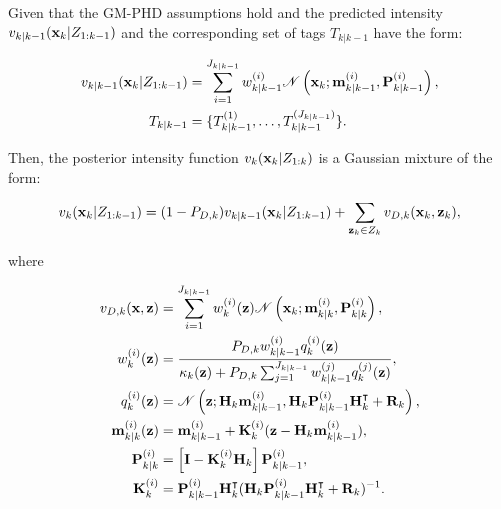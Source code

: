 \begin{theorem}\label{theorem:gm-phd-update}
    Given that the GM-PHD assumptions hold and the predicted intensity $v_{k|k-1}(\vecat{x}{k} | Z_{1:k-1})$ and the corresponding set of tags $T_{k|k-1}$ have the form:

    \begin{align}
        v_{k|k-1}(\vecat{x}{k} | Z_{1:k-1})
        &= \sum_{i=1}^{J_{k|k-1}} w_{k|k-1}^{(i)} \mathscr{N}\left(\vecat{x}{k}; \vecat{m}{k|k-1}^{(i)}, \vecat{P}{k|k-1}^{(i)}\right), \\
        T_{k|k-1}
        &= \{ T_{k|k-1}^{(1)}, \ldots, T_{k|k-1}^{(J_{k|k-1})} \}.
    \end{align}

    \noindent Then, the posterior intensity function $v_{k}(\vecat{x}{k} | Z_{1:k})$ is a Gaussian mixture of the form:

    \begin{equation}\label{eq:gmphd-update:posterior}
        v_{k}(\vecat{x}{k} | Z_{1:k-1})
        = (1 - P_{D,k}) v_{k|k-1}(\vecat{x}{k} | Z_{1:k-1})
        + \sum_{\vecat{z}{k} \in Z_k} v_{D,k}(\vecat{x}{k}, \vecat{z}{k}),
    \end{equation}

    \noindent where

    \begin{align}
    v_{D,k}(\mathbf{x}, \mathbf{z}) 
        &= \sum_{i=1}^{J_{k|k-1}} w_{k}^{(i)}(\mathbf{z}) \mathscr{N}\left(\vecat{x}{k}; \vecat{m}{k|k}^{(i)}, \vecat{P}{k|k}^{(i)}\right), \label{eq:gmphd-update:posterior:hyp-intensity} \\
    w_{k}^{(i)}(\mathbf{z})
        &= \frac{
            P_{D,k} w_{k|k-1}^{(i)} q_{k}^{(i)}(\mathbf{z})
        }{
            \kappa_k(\mathbf{z}) + P_{D,k} \sum_{j=1}^{J_{k|k-1}} w_{k|k-1}^{(j)} q_{k}^{(j)}(\mathbf{z})
        }, \label{eq:gmphd-update:posterior:hyp-weight} \\
    q_{k}^{(i)}(\mathbf{z})
        &= \mathscr{N}\left(\mathbf{z}; \vecat{H}{k} \vecat{m}{k|k-1}^{(i)}, \vecat{H}{k}\vecat{P}{k|k-1}^{(i)} \vecat{H}{k}^\intercal + \vecat{R}{k}\right), \label{eq:gmphd-update:posterior:hyp-pred-meas} \\
    \vecat{m}{k|k}^{(i)}(\mathbf{z})
        &= \vecat{m}{k|k-1}^{(i)} + \vecat{K}{k}^{(i)}(\mathbf{z} - \vecat{H}{k} \vecat{m}{k|k-1}^{(i)}), \label{eq:gmphd-update:posterior:hyp-mean} \\
    \vecat{P}{k|k}^{(i)}
        &= \left[ \mathbf{I} - \vecat{K}{k}^{(i)} \vecat{H}{k} \right] \vecat{P}{k|k-1}^{(i)}, \label{eq:gmphd-update:posterior:hyp-cov} \\
    \vecat{K}{k}^{(i)}
        &= \vecat{P}{k|k-1}^{(i)} \vecat{H}{k}^\intercal (\vecat{H}{k} \vecat{P}{k|k-1}^{(i)} \vecat{H}{k}^\intercal + \vecat{R}{k})^{-1}. \label{eq:gmphd-update:posterior:hyp-gain}
    \end{align}


\end{theorem}
